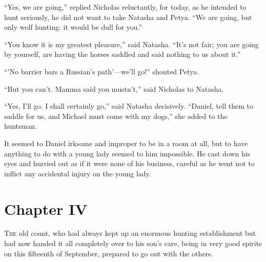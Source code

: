 ``Yes, we are going,'' replied Nicholas reluctantly, for today,
as he intended to hunt seriously, he did not want to take Natasha
and Petya.  ``We are going, but only wolf hunting: it would be
dull for you.''

``You know it is my greatest pleasure,'' said Natasha. ``It's not
fair; you are going by yourself, are having the horses saddled
and said nothing to us about it.''

``'No barrier bars a Russian's path'---we'll go!'' shouted Petya.

``But you can't. Mamma said you mustn't,'' said Nicholas to
Natasha.

``Yes, I'll go. I shall certainly go,'' said Natasha
decisively. ``Daniel, tell them to saddle for us, and Michael
must come with my dogs,'' she added to the huntsman.

It seemed to Daniel irksome and improper to be in a room at all,
but to have anything to do with a young lady seemed to him
impossible. He cast down his eyes and hurried out as if it were
none of his business, careful as he went not to inflict any
accidental injury on the young lady.


\chapter*{Chapter IV}
\ifaudio     
{} 
\fi

\lettrine[lines=2, loversize=0.3, lraise=0]{\initfamily T}{he}
old count, who had always kept up an enormous hunting
establishment but had now handed it all completely over to his
son's care, being in very good spirits on this fifteenth of
September, prepared to go out with the others.


